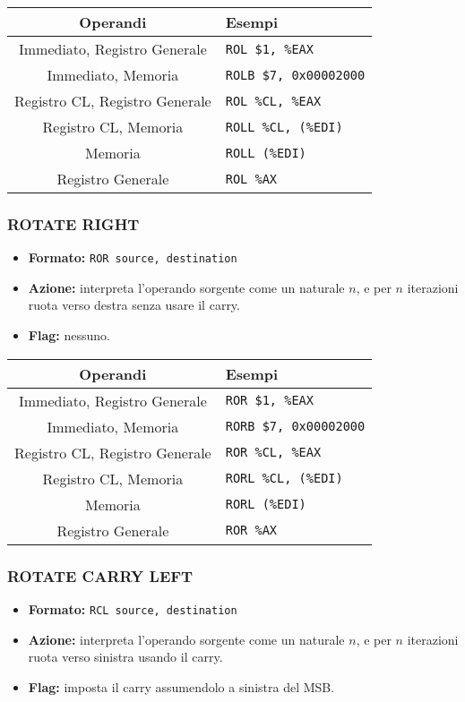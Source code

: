 \documentclass[a4paper,11pt]{article}
\begin{document}
		\begin{table}[H]
		\center {}
			\begin{tabular} { c | p{5cm} }
				\bfseries Operandi & \bfseries Esempi \\
				\hline
				Immediato, Registro Generale & \texttt{ROL \$1, \%EAX} \\
				Immediato, Memoria & \texttt{ROLB \$7, 0x00002000} \\
				Registro CL, Registro Generale & \texttt{ROL \%CL, \%EAX} \\
				Registro CL, Memoria & \texttt{ROLL \%CL, (\%EDI)} \\
				Memoria & \texttt{ROLL (\%EDI)} \\ 
				Registro Generale & \texttt{ROL \%AX}
			\end{tabular}
		\end{table}

\subsubsection{ROTATE RIGHT}
\begin{itemize}
	\item \textbf{Formato:} \texttt{ROR source, destination}
	\item \textbf{Azione:} interpreta l'operando sorgente come un naturale $n$, e per $n$ iterazioni ruota verso destra senza usare il carry.
	\item \textbf{Flag:} nessuno.
\end{itemize}

		\begin{table}[H]
		\center {}
			\begin{tabular} { c | p{5cm} }
				\bfseries Operandi & \bfseries Esempi \\
				\hline
				Immediato, Registro Generale & \texttt{ROR \$1, \%EAX} \\
				Immediato, Memoria & \texttt{RORB \$7, 0x00002000} \\
				Registro CL, Registro Generale & \texttt{ROR \%CL, \%EAX} \\
				Registro CL, Memoria & \texttt{RORL \%CL, (\%EDI)} \\
				Memoria & \texttt{RORL (\%EDI)} \\ 
				Registro Generale & \texttt{ROR \%AX}
			\end{tabular}
		\end{table}

\subsubsection{ROTATE CARRY LEFT}
\begin{itemize}
	\item \textbf{Formato:} \texttt{RCL source, destination}
	\item \textbf{Azione:} interpreta l'operando sorgente come un naturale $n$, e per $n$ iterazioni ruota verso sinistra usando il carry.
	\item \textbf{Flag:} imposta il carry assumendolo a sinistra del MSB.
\end{itemize}
\end{document}
